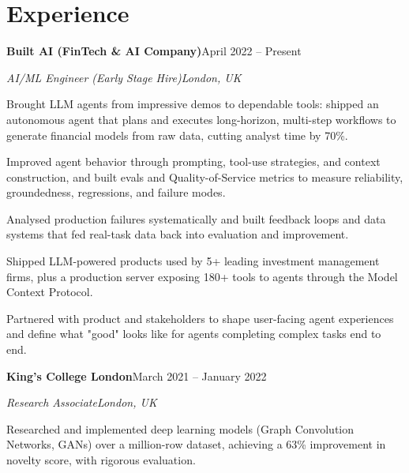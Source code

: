 \documentclass[10pt,letterpaper]{article}
\newcommand{\entry}[4]{%
  {\color{company}\bfseries #1}\hfill {\color{muted}#2}\par
  \vspace{1pt}
  {\itshape #3}\hfill {\color{muted}\itshape #4}\par
  \vspace{3pt}%
}
\begin{document}
\section{Experience}
\entry{Built AI (FinTech \& AI Company)}{April 2022 -- Present}{AI/ML Engineer (Early Stage Hire)}{London, UK}
\begin{tight}
  \item Brought LLM agents from impressive demos to dependable tools: shipped an autonomous agent that plans and executes long-horizon, multi-step workflows to generate financial models from raw data, cutting analyst time by 70\%.
  \item Improved agent behavior through prompting, tool-use strategies, and context construction, and built evals and Quality-of-Service metrics to measure reliability, groundedness, regressions, and failure modes.
  \item Analysed production failures systematically and built feedback loops and data systems that fed real-task data back into evaluation and improvement.
  \item Shipped LLM-powered products used by 5+ leading investment management firms, plus a production server exposing 180+ tools to agents through the Model Context Protocol.
  \item Partnered with product and stakeholders to shape user-facing agent experiences and define what "good" looks like for agents completing complex tasks end to end.
\end{tight}

\entry{King's College London}{March 2021 -- January 2022}{Research Associate}{London, UK}
\begin{tight}
  \item Researched and implemented deep learning models (Graph Convolution Networks, GANs) over a million-row dataset, achieving a 63\% improvement in novelty score, with rigorous evaluation.
\end{tight}

\end{document}

